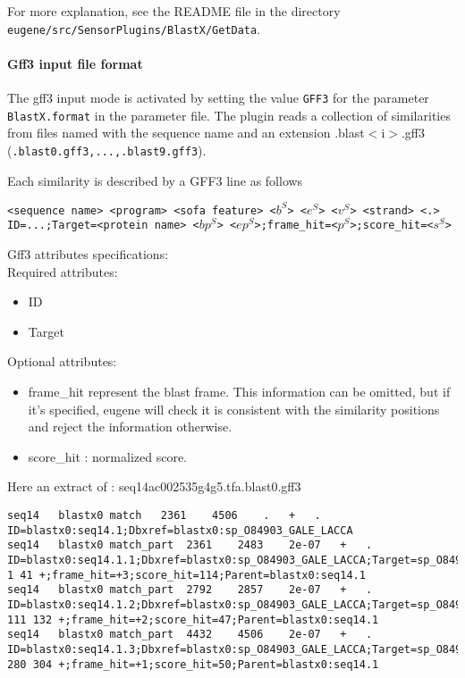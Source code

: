 For more explanation, see the README file in the directory
\texttt{eugene/src/SensorPlugins/BlastX/GetData}.

\paragraph{Gff3 input file format}

The gff3 input mode is activated by setting the value \texttt{GFF3}
for the parameter \texttt{BlastX.format} in the parameter file.  The
plugin reads a collection of similarities from files named with the
sequence name and an extension .blast$<$i$>$.gff3
(\texttt{.blast0.gff3,...,.blast9.gff3}).

Each similarity is described by a GFF3 line as follows

\texttt{<sequence name> <program> <sofa feature> <$b^S$> <$e^S$> <$v^S$> <strand> <.> ID=...;Target=<protein name> <$bp^S$> <$ep^S$>;frame\_hit=<$p^S$>;score\_hit=<$s^S$>}

Gff3 attributes specifications:\\
Required attributes:\\
	\begin{itemize}
	\item ID
	\item Target
	\end{itemize}

Optional attributes:\\
	\begin{itemize}
	\item frame\_hit represent the blast frame. This information
          can be omitted, but if it's specified, eugene will check it
          is consistent with the similarity positions and reject the
          information otherwise.
	\item score\_hit :  normalized score.
	\end{itemize}

Here an extract of : seq14ac002535g4g5.tfa.blast0.gff3
\begin{Verbatim}[fontsize=\tiny]
seq14	blastx0	match	2361	4506	.	+	.	ID=blastx0:seq14.1;Dbxref=blastx0:sp_O84903_GALE_LACCA 
seq14	blastx0	match_part	2361	2483	2e-07	+	.	ID=blastx0:seq14.1.1;Dbxref=blastx0:sp_O84903_GALE_LACCA;Target=sp_O84903_GALE_LACCA 1 41 +;frame_hit=+3;score_hit=114;Parent=blastx0:seq14.1 
seq14	blastx0	match_part	2792	2857	2e-07	+	.	ID=blastx0:seq14.1.2;Dbxref=blastx0:sp_O84903_GALE_LACCA;Target=sp_O84903_GALE_LACCA 111 132 +;frame_hit=+2;score_hit=47;Parent=blastx0:seq14.1 
seq14	blastx0	match_part	4432	4506	2e-07	+	.	ID=blastx0:seq14.1.3;Dbxref=blastx0:sp_O84903_GALE_LACCA;Target=sp_O84903_GALE_LACCA 280 304 +;frame_hit=+1;score_hit=50;Parent=blastx0:seq14.1
\end{Verbatim}

